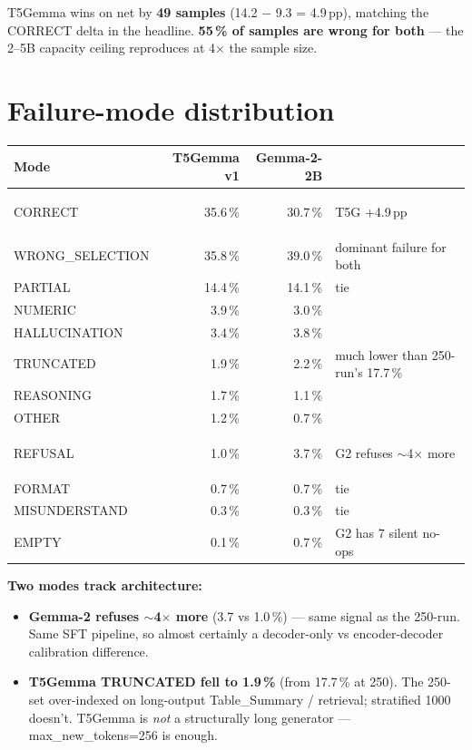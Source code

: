 \documentclass[11pt]{article}
\newcommand{\hl}[1]{\colorbox{hilite}{\strut #1}}
\begin{document}
\medskip

T5Gemma wins on net by \textbf{49 samples} (14.2 $-$ 9.3 = 4.9\,pp),
matching the CORRECT delta in the headline. \textbf{55\,\% of samples are
wrong for both} --- the 2--5B capacity ceiling reproduces at 4$\times$ the
sample size.

\section*{Failure-mode distribution}

\begin{tabular}{@{}lrrl@{}}
\toprule
Mode & T5Gemma v1 & Gemma-2-2B & \\
\midrule
CORRECT & \hl{35.6\,\%} & 30.7\,\% & T5G +4.9\,pp \\
WRONG\_SELECTION & 35.8\,\% & 39.0\,\% & dominant failure for both \\
PARTIAL & 14.4\,\% & 14.1\,\% & tie \\
NUMERIC & 3.9\,\% & 3.0\,\% & \\
HALLUCINATION & 3.4\,\% & 3.8\,\% & \\
TRUNCATED & 1.9\,\% & 2.2\,\% & much lower than 250-run's 17.7\,\% \\
REASONING & 1.7\,\% & 1.1\,\% & \\
OTHER & 1.2\,\% & 0.7\,\% & \\
REFUSAL & 1.0\,\% & \hl{3.7\,\%} & G2 refuses $\sim$4$\times$ more \\
FORMAT & 0.7\,\% & 0.7\,\% & tie \\
MISUNDERSTAND & 0.3\,\% & 0.3\,\% & tie \\
EMPTY & 0.1\,\% & 0.7\,\% & G2 has 7 silent no-ops \\
\bottomrule
\end{tabular}

\medskip

\textbf{Two modes track architecture:}
\begin{itemize}
  \item \textbf{Gemma-2 refuses $\sim$4$\times$ more} (3.7 vs 1.0\,\%) ---
        same signal as the 250-run. Same SFT pipeline, so almost certainly
        a decoder-only vs encoder-decoder calibration difference.
  \item \textbf{T5Gemma TRUNCATED fell to 1.9\,\%} (from 17.7\,\% at 250).
        The 250-set over-indexed on long-output Table\_Summary / retrieval;
        stratified 1000 doesn't. T5Gemma is \emph{not} a structurally long
        generator --- max\_new\_tokens=256 is enough.
\end{itemize}
\end{document}
